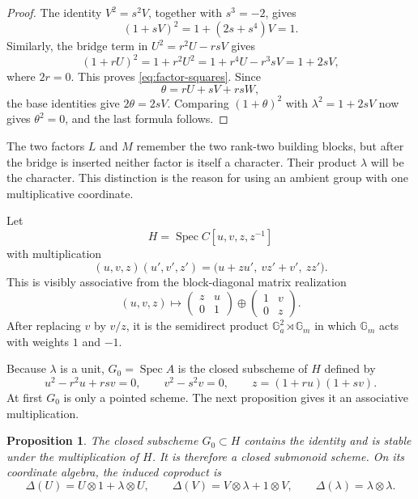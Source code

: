 \documentclass[11pt]{amsart}
\newtheorem{proposition}[theorem]{Proposition}
\theoremstyle{definition}
\theoremstyle{remark}
\newcommand{\Ga}{\mathbb G_a}
\newcommand{\Gm}{\mathbb G_m}
\newcommand{\Spec}{\operatorname{Spec}}
\newcommand{\ot}{\otimes}
\begin{document}
\begin{proof}
The identity \(V^2=s^2V\), together with \(s^3=-2\), gives
\[
 (1+sV)^2=1+(2s+s^4)V=1.
\]
Similarly, the bridge term in \(U^2=r^2U-rsV\) gives
\[
 (1+rU)^2=1+r^2U^2
 =1+r^4U-r^3sV=1+2sV,
\]
where \(2r=0\).  This proves \eqref{eq:factor-squares}.  Since
\[
 \theta=rU+sV+rsW,
\]
the base identities give \(2\theta=2sV\).  Comparing
\((1+\theta)^2\) with \(\lambda^2=1+2sV\) now gives \(\theta^2=0\), and the
last formula follows.
\end{proof}

The two factors \(L\) and \(M\) remember the two rank-two building blocks,
but after the bridge is inserted neither factor is itself a character.
Their product \(\lambda\) will be the character.  This distinction is the
reason for using an ambient group with one multiplicative coordinate.

Let
\[
 H=\Spec C[u,v,z,z^{-1}]
\]
with multiplication
\begin{equation}\label{eq:H-law}
 (u,v,z)(u',v',z')
 =\bigl(u+zu',\ vz'+v',\ zz'\bigr).
\end{equation}
This is visibly associative from the block-diagonal matrix realization
\begin{equation}\label{eq:matrix-realization}
 (u,v,z)\longmapsto
 \begin{pmatrix}z&u\\0&1\end{pmatrix}
 \oplus
 \begin{pmatrix}1&v\\0&z\end{pmatrix}.
\end{equation}
After replacing \(v\) by \(v/z\), it is the semidirect product
\(\Ga^2\rtimes\Gm\) in which \(\Gm\) acts with weights \(1\) and \(-1\).

Because \(\lambda\) is a unit, \(G_0=\Spec A\) is the closed subscheme of
\(H\) defined by
\begin{equation}\label{eq:G-in-H}
 u^2-r^2u+rsv=0,
 \qquad
 v^2-s^2v=0,
 \qquad
 z=(1+ru)(1+sv).
\end{equation}
At first \(G_0\) is only a pointed scheme.  The next proposition gives it
an associative multiplication.

\begin{proposition}\label{prop:submonoid}
The closed subscheme \(G_0\subset H\) contains the identity and is stable
under the multiplication of \(H\).  It is therefore a closed submonoid
scheme.  On its coordinate algebra, the induced coproduct is
\begin{equation}\label{eq:Delta-main}
 \Delta(U)=U\ot1+\lambda\ot U,
 \qquad
 \Delta(V)=V\ot\lambda+1\ot V,
 \qquad
 \Delta(\lambda)=\lambda\ot\lambda.
\end{equation}
\end{proposition}
\end{document}
